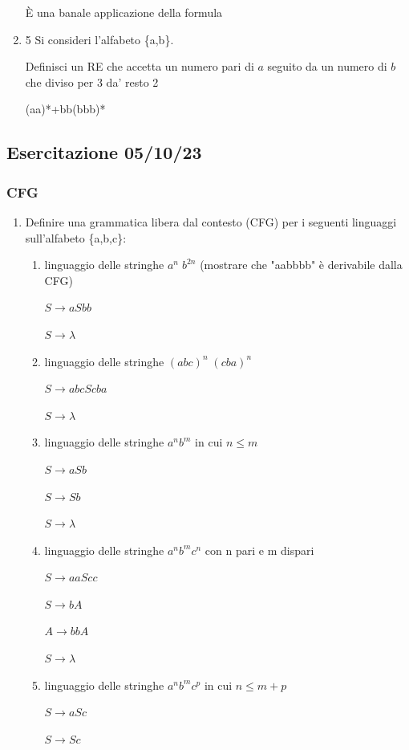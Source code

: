 \begin{enumerate}
  È una banale applicazione della formula


\item 5 Si consideri l'alfabeto \{a,b\}.

  Definisci un RE che accetta un numero pari di $a$ seguito da un numero di $b$ che diviso per 3 da' resto 2

  (aa)*+bb(bbb)*
\end{enumerate}
\subsection{Esercitazione 05/10/23}
\subsubsection{CFG}
\begin{enumerate}
  \item Definire una grammatica libera dal contesto (CFG) per i seguenti linguaggi sull'alfabeto \{a,b,c\}:
    \begin{enumerate}
      \item linguaggio delle stringhe $a^n \; b^{2n}$ (mostrare che "aabbbb" è derivabile dalla CFG)

        $S \rightarrow aSbb$

        $S \rightarrow \lambda$
      \item linguaggio delle stringhe $(abc)^n \; (cba)^n$

        $S \rightarrow abc S cba$

        $S \rightarrow \lambda$
      \item linguaggio delle stringhe $a^n b^m$ in cui $n \leq m$

        $S \rightarrow a S b$

        $S \rightarrow S b$

        $S \rightarrow \lambda$
      \item linguaggio delle stringhe $a^n b^m c^n$ con n pari e m dispari

        $S \rightarrow aaScc$

        $S \rightarrow bA$

        $A \rightarrow bbA$

        $S \rightarrow \lambda$
      \item linguaggio delle stringhe $a^n b^m c^p$ in cui $n \leq m+p$

        $S \rightarrow aSc$
        
        $S \rightarrow Sc$


\end{enumerate}
\end{enumerate}
